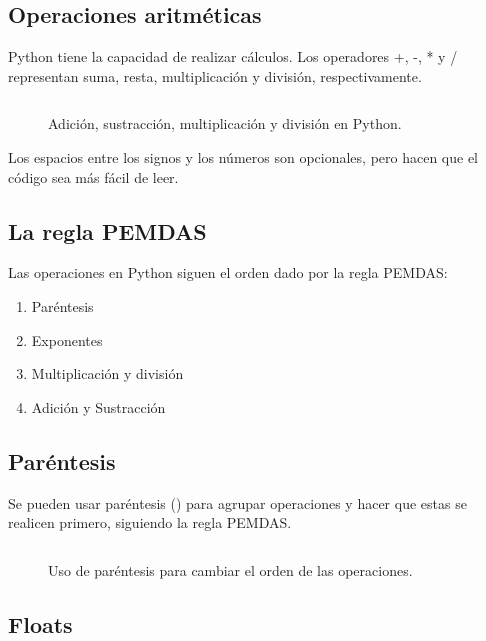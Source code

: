\documentclass{article}
\begin{document}
\subsection{Operaciones aritméticas}

Python tiene la capacidad de realizar cálculos. Los operadores +, -, * y / representan suma, resta, multiplicación y división, respectivamente.

\begin{figure}[ht!]
  \inputminted[frame=single, linenos]{python}{codigo/cap2/aritmetica_1.py}
  \caption{Adición, sustracción, multiplicación y división en Python.}
\end{figure}

Los espacios entre los signos y los números son opcionales, pero hacen que el código sea más fácil de leer.

\subsection{La regla PEMDAS}

Las operaciones en Python siguen el orden dado por la regla PEMDAS:

\begin{enumerate}
  \item Paréntesis
  \item Exponentes
  \item Multiplicación y división
  \item Adición y Sustracción
\end{enumerate}


\subsection{Paréntesis}

Se pueden usar paréntesis () para agrupar operaciones y hacer que estas se realicen primero, siguiendo la regla PEMDAS.

\begin{figure}[ht!]
  \inputminted[frame=single, linenos]{python}{codigo/cap2/aritmetica_3.py}
  \caption{Uso de paréntesis para cambiar el orden de las operaciones.}
\end{figure}

\subsection{Floats}
    
\end{document}
